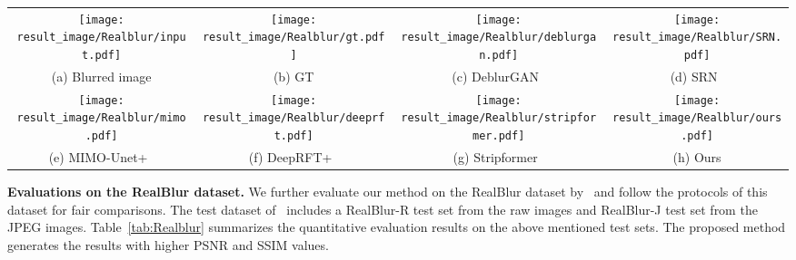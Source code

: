 \documentclass[10pt,twocolumn,letterpaper]{article}
\begin{document}
\begin{figure*}[t]
\footnotesize
\centering
    \begin{tabular}{cccc}
\texttt{[image: result\_image/Realblur/input.pdf]} &\hspace{-4.5mm}
    \texttt{[image: result\_image/Realblur/gt.pdf]} &\hspace{-4.5mm}
    \texttt{[image: result\_image/Realblur/deblurgan.pdf]} &\hspace{-4.5mm}
    \texttt{[image: result\_image/Realblur/SRN.pdf]} \\
\hspace{-4.5mm} (a) Blurred image &\hspace{-4.5mm} (b) GT &\hspace{-4.5mm} (c) DeblurGAN~\cite{DeblurGAN} &\hspace{-4.5mm} (d) SRN~\cite{SRN}\\
    \texttt{[image: result\_image/Realblur/mimo.pdf]}  &\hspace{-4.5mm}
    \texttt{[image: result\_image/Realblur/deeprft.pdf]}  &\hspace{-4.5mm}
    \texttt{[image: result\_image/Realblur/stripformer.pdf]}  &\hspace{-4.5mm}
    \texttt{[image: result\_image/Realblur/ours.pdf]}\\
\hspace{-4.5mm} (e) MIMO-Unet+~\cite{MIMO} &\hspace{-4.5mm} (f) DeepRFT+~\cite{Deeprft} &\hspace{-4.5mm} (g) Stripformer~\cite{Stripformer} &\hspace{-4.5mm} (h) Ours
    \end{tabular}
\vspace{-2mm}
    \caption{Deblurred results on the RealBlur dataset~\cite{Realblur}. The characters or the structural details in (c)-(g) are not recovered well. The proposed method generates an image with much clearer characters and structural details.}
    \label{fig:Realblur_result}
\vspace{-4mm}
\end{figure*}


\vspace{-2mm}
{\flushleft \textbf{Evaluations on the RealBlur dataset.}}
We further evaluate our method on the RealBlur dataset by~\cite{Realblur} and follow the protocols of this dataset for fair comparisons.
The test dataset of~\cite{Realblur} includes a RealBlur-R test set from the raw images and RealBlur-J test set from the JPEG images.
Table~\ref{tab:Realblur} summarizes the quantitative evaluation results on the above mentioned test sets.
The proposed method generates the results with higher PSNR and SSIM values.
\end{document}
